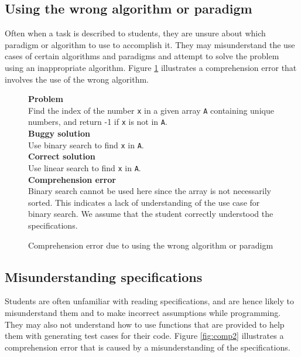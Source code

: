 \documentclass[11pt,letterpaper]{article}
\begin{document}
\subsection{Using the wrong algorithm or paradigm}
\label{sec:comp1}
Often when a task is described to students, they are unsure about which paradigm or algorithm to use to accomplish it. They may misunderstand the use cases of certain algorithms and paradigms and attempt to solve the problem using an inappropriate algorithm. Figure \ref{fig:comp1} illustrates a comprehension error that involves the use of the wrong algorithm.

\begin{figure}
\begin{framed}
\setlength{\parindent}{0cm}
\textbf{Problem} \\
Find the index of the number \texttt{x} in a given array \texttt{A} containing unique numbers, and return -1 if \texttt{x} is not in \texttt{A}.\\

\textbf{Buggy solution} \\
Use binary search to find \texttt{x} in \texttt{A}.\\

\textbf{Correct solution}\\
Use linear search to find \texttt{x} in \texttt{A}.\\

\textbf{Comprehension error}\\
Binary search cannot be used here since the array is not necessarily sorted. This indicates a lack of understanding of the use case for binary search. We assume that the student correctly understood the specifications.
\end{framed}
\caption{Comprehension error due to using the wrong algorithm or paradigm}
\label{fig:comp1}
\end{figure}

\subsection{Misunderstanding specifications}
\label{sec:comp2}
Students are often unfamiliar with reading specifications, and are hence likely to misunderstand them and to make incorrect assumptions while programming. They may also not understand how to use functions that are provided to help them with generating test cases for their code. Figure \ref{fig:comp2} illustrates a comprehension error that is caused by a misunderstanding of the specifications.\\
\end{document}
